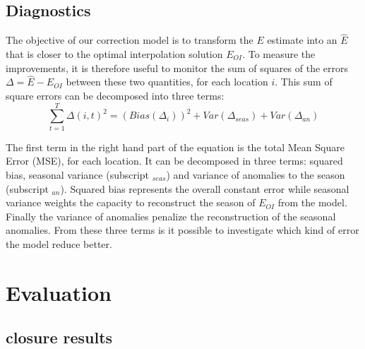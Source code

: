 \documentclass[draft]{agujournal2019}
\begin{document}
\subsection{Diagnostics}

The objective of our correction model is to transform the $E$ estimate into an $\hat E$ that is closer to the optimal interpolation solution $E_{OI}$. To measure the improvements, it is therefore useful to monitor the sum of squares of the errors $\Delta = \hat E - E_{OI}$ between these two quantities, for each location $i$.
This sum of square errors can be decomposed into three terms:
\begin{equation}
\sum_{t=1}^T {\Delta(i,t)}^2 =   \left(Bias\left(\Delta_i  \right) \right)^2 + Var\left( \Delta_{seas} \right) + Var\left( \Delta_{an} \right)
\end{equation}

The first term in the right hand part of the equation is the total Mean Square Error (MSE), for each location. It can be decomposed in three terms: squared bias, seasonal variance (subscript $_{seas}$) and variance of anomalies to the season (subscript $_{an}$). Squared bias represents the overall constant error while seasonal variance weights the capacity to reconstruct the season of $E_{OI}$ from the model. Finally the variance of anomalies penalize the reconstruction of the seasonal anomalies. From these three terms is it possible to investigate which kind of error the model reduce better.





\section{Evaluation}



\subsection{closure results}
\end{document}
